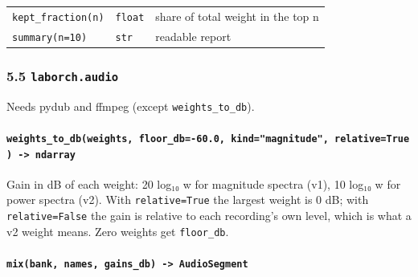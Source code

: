 \documentclass[
  10pt,
]{article}
\begin{document}
\begin{longtable}[]{@{}lll@{}}
\begin{minipage}[t]{0.30\columnwidth}
\texttt{kept\_fraction(n)}\strut
\end{minipage} &
\begin{minipage}[t]{0.30\columnwidth}\raggedright
\texttt{float}\strut
\end{minipage} &
\begin{minipage}[t]{0.30\columnwidth}\raggedright
share of total weight in the top n\strut
\end{minipage}\tabularnewline
\begin{minipage}[t]{0.30\columnwidth}\raggedright
\texttt{summary(n=10)}\strut
\end{minipage} &
\begin{minipage}[t]{0.30\columnwidth}\raggedright
\texttt{str}\strut
\end{minipage} &
\begin{minipage}[t]{0.30\columnwidth}\raggedright
readable report\strut
\end{minipage}\tabularnewline
\bottomrule
\end{longtable}

\subsubsection{\texorpdfstring{5.5
\texttt{laborch.audio}}{5.5 laborch.audio}}

Needs pydub and ffmpeg (except \texttt{weights\_to\_db}).

\paragraph{\texorpdfstring{\texttt{weights\_to\_db(weights,\ floor\_db=-60.0,\ kind="magnitude",\ relative=True)\ -\textgreater{}\ ndarray}}{weights\_to\_db(weights, floor\_db=-60.0, kind="magnitude", relative=True) -\textgreater{} ndarray}}

Gain in dB of each weight: 20 log₁₀ w for magnitude spectra
(v1), 10 log₁₀ w for power spectra (v2). With
\texttt{relative=True} the largest weight is 0 dB; with
\texttt{relative=False} the gain is relative to each
recording's own level, which is what a v2 weight means. Zero
weights get \texttt{floor\_db}.

\paragraph{\texorpdfstring{\texttt{mix(bank,\ names,\ gains\_db)\ -\textgreater{}\ AudioSegment}}{mix(bank, names, gains\_db) -\textgreater{} AudioSegment}}
\end{document}

